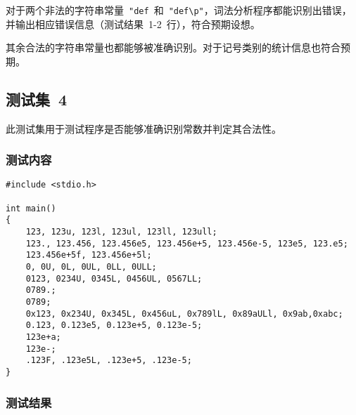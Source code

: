 \documentclass[lang=cn,11pt,a4paper]{paper}
\begin{document}
对于两个非法的字符串常量\ \lstinline{"def}\ 和\ \lstinline{"def\p"}，词法分析程序都能识别出错误，并输出相应错误信息（测试结果\ 1-2\ 行），符合预期设想。

其余合法的字符串常量也都能够被准确识别。对于记号类别的统计信息也符合预期。

\subsection{测试集\ 4}

此测试集用于测试程序是否能够准确识别常数并判定其合法性。

\subsubsection{测试内容}

\begin{lstlisting}
#include <stdio.h>

int main()
{
    123, 123u, 123l, 123ul, 123ll, 123ull;
    123., 123.456, 123.456e5, 123.456e+5, 123.456e-5, 123e5, 123.e5;
    123.456e+5f, 123.456e+5l;
    0, 0U, 0L, 0UL, 0LL, 0ULL;
    0123, 0234U, 0345L, 0456UL, 0567LL;
    0789.;
    0789;
    0x123, 0x234U, 0x345L, 0x456uL, 0x789lL, 0x89aULl, 0x9ab,0xabc;
    0.123, 0.123e5, 0.123e+5, 0.123e-5;
    123e+a;
    123e-;
    .123F, .123e5L, .123e+5, .123e-5;
}
\end{lstlisting}

\subsubsection{测试结果}
\end{document}
